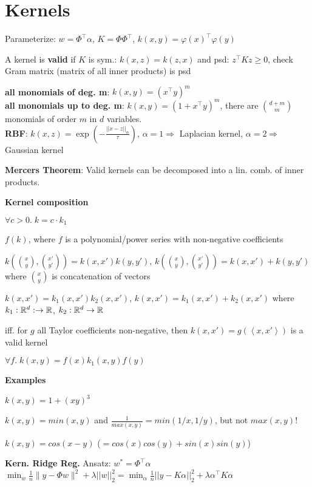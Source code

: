 \section*{Kernels}

Parameterize: $w = \Phi^\top \alpha$, $K = \Phi \Phi^\top$, $k(x,y) = \varphi(x)^\top \varphi(y)$

A kernel is \textbf{valid} if $K$ is sym.: $k(x,z) = k(z,x)$ and psd: $z^\top K z \geq 0$, check Gram matrix (matrix of all inner products) is psd

\textbf{all monomials of deg. m}: $k(x,y) = (x^\top y)^m$ \\
\textbf{all monomials up to deg. m}: $k(x,y) = (1+x^\top y)^m$, there are $\binom{d+m}{m}$ monomials of 
order $m$ in $d$ variables.\\

\textbf{RBF}: $k(x, z) = \exp ( -\frac{||x - z||_\alpha}{\tau} )$, $\alpha = 1 \Rightarrow $ Laplacian kernel, $\alpha = 2 \Rightarrow $ Gaussian kernel

\textbf{Mercers Theorem}: Valid kernels can be decomposed into a lin. comb. of inner products.

\textbf{Kernel composition}

\begin{rowlist}
    \item $\forall c > 0. \; k = c \cdot k_1$
    \item $f(k)$, where $f$ is a polynomial/power series with non-negative coefficients
    \item{
        $k(\binom{x}{y}, \binom{x'}{y'})=k(x,x')k(y,y')$, $k(\binom{x}{y}, \binom{x'}{y'})=k(x,x') + k(y,y')$ where $\binom{x}{y}$ is concatenation of vectors
    }
    \item{
        $k(x, x') = k_1(x, x')k_2(x, x')$, $k(x, x') = k_1(x, x') + k_2(x, x')$ where $ k_1: \mathbb{R}^d : \rightarrow \mathbb{R}$, $k_2: \mathbb{R}^d \rightarrow \mathbb{R} $
    }
    \item iff. for $g$ all Taylor coefficients non-negative, then $k(x, x') = g(\left< x, x' \right>)$ is a valid kernel
    \item $\forall f. \; k(x,y) = f(x)k_1(x,y)f(y)$
\end{rowlist}

\textbf{Examples}

\begin{rowlist}
    \item $k(x, y) = 1 + (xy)^3$
    \item $k(x, y) = min(x, y)$ and $\frac{1}{max(x, y)} = min(1/x, 1/y)$, but not $max(x, y)$!
    \item $k(x, y) = cos(x - y)$ ($=cos(x)cos(y) + sin(x)sin(y)$)
\end{rowlist}

\textbf{Kern. Ridge Reg.}
Ansatz: $w^*=\Phi^\top\alpha$\\
$\min_w \frac1n \|y - \Phi w\|^2 + \lambda ||w||_2^2 = \min_\alpha \frac1n ||y - K\alpha||_2^2 + \lambda \alpha^\top K \alpha$
